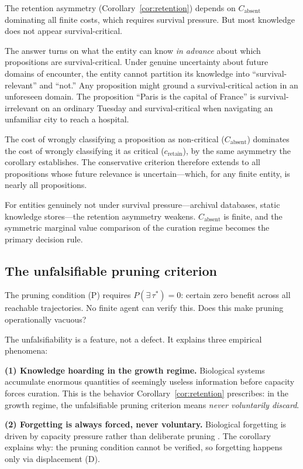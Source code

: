 \documentclass[11pt]{article}
\theoremstyle{definition}
\theoremstyle{remark}
\begin{document}
The retention asymmetry (Corollary~\ref{cor:retention}) depends on
$C_{\text{absent}}$ dominating all finite costs, which requires
survival pressure. But most knowledge does not appear
survival-critical.

The answer turns on what the entity can know \emph{in advance} about
which propositions are survival-critical. Under genuine uncertainty
about future domains of encounter, the entity cannot partition its
knowledge into ``survival-relevant'' and ``not.'' Any proposition
might ground a survival-critical action in an unforeseen domain. The
proposition ``Paris is the capital of France'' is survival-irrelevant
on an ordinary Tuesday and survival-critical when navigating an
unfamiliar city to reach a hospital.

The cost of wrongly classifying a proposition as non-critical
($C_{\text{absent}}$) dominates the cost of wrongly classifying it
as critical ($c_{\text{retain}}$), by the same asymmetry the
corollary establishes. The conservative criterion therefore extends
to all propositions whose future relevance is uncertain---which, for
any finite entity, is nearly all propositions.

For entities genuinely not under survival pressure---archival databases,
static knowledge stores---the retention asymmetry weakens.
$C_{\text{absent}}$ is finite, and the symmetric marginal value
comparison of the curation regime becomes the primary decision rule.

\subsection{The unfalsifiable pruning criterion}

The pruning condition (P) requires $P(\exists\,\tau^*) = 0$: certain
zero benefit across all reachable trajectories. No finite agent can
verify this. Does this make pruning operationally vacuous?

The unfalsifiability is a feature, not a defect. It explains three
empirical phenomena:

\textbf{(1) Knowledge hoarding in the growth regime.} Biological
systems accumulate enormous quantities of seemingly useless information
before capacity forces curation. This is the behavior
Corollary~\ref{cor:retention} prescribes: in the growth regime, the
unfalsifiable pruning criterion means \emph{never voluntarily discard}.

\textbf{(2) Forgetting is always forced, never voluntary.} Biological
forgetting is driven by capacity pressure rather than deliberate
pruning \cite{AndersonSchooler1991}. The corollary explains why:
the pruning condition cannot be verified, so forgetting happens only
via displacement (D).
\end{document}
